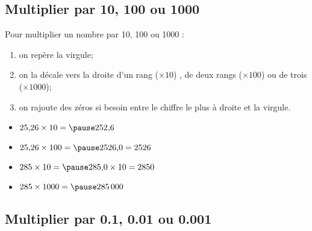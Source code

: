 \documentclass[xcolor={dvipsnames}]{beamer}
\begin{document}
\subsection{Multiplier par 10, 100 ou 1000}

\begin{frame}
\begin{mymeth}
	
	Pour multiplier un nombre par 10, 100 ou 1000 :\pause
		
		\begin{enumerate}%
			\item on repère la virgule; \pause
			\item on la décale vers la droite d'un rang ($\times 10$) , \pause de deux rangs ($\times 100$) ou de trois ($\times 1000$);\pause
			\item on rajoute des zéros si besoin entre \pause le chiffre le plus à droite et la virgule.
		\end{enumerate}

\end{mymeth}

\begin{myexs}
	
		\begin{itemize}
			
				\item $\num{25.26} \times 10 = \pause \num{252.6}$ 
				\item $\num{25.26} \times 100 =  \pause \num{2526.0} = \num{2526}$
				\item $\num{285} \times 10 = \pause \num{285.0} \times \num{10}= \num{2850}$ 
				\item $\num{285} \times 1000 =  \pause \num{285000}$ 
			
		\end{itemize}	
	
	
\end{myexs}
\end{frame}

\subsection{Multiplier par \num{0.1}, \num{0.01} ou \num{0.001}}
\end{document}
